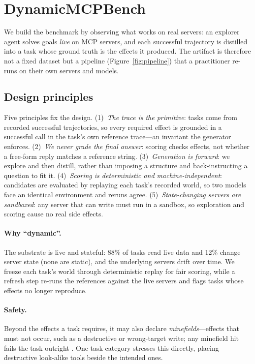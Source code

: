 \section{DynamicMCPBench}
\label{sec:benchmark}

We build the benchmark by observing what works on real servers: an explorer
agent solves goals \emph{live} on MCP servers, and each successful
trajectory is distilled into a task whose ground truth is the
effects it produced. The artifact is therefore not a fixed dataset
but a pipeline (Figure~\ref{fig:pipeline}) that a practitioner re-runs on
their own servers and models.

\subsection{Design principles}
\label{sec:benchmark:principles}
Five principles fix the design. (1)~\emph{The trace is the primitive}: tasks
come from recorded successful trajectories, so every required effect is
grounded in a successful call in the task's own reference trace---an invariant
the generator enforces. (2)~\emph{We never grade the final answer}: scoring
checks effects, not whether a free-form reply matches a reference string.
(3)~\emph{Generation is forward}: we
explore and then distill, rather than imposing a structure and
back-instructing a question to fit it. (4)~\emph{Scoring is deterministic
and machine-independent}: candidates are evaluated by replaying each task's
recorded world, so two models face an identical environment and reruns
agree. (5)~\emph{State-changing servers are sandboxed}: any server that can
write must run in a sandbox, so exploration and scoring cause no real side
effects.

\paragraph{Why ``dynamic''.} The substrate is live and stateful: 88\% of
tasks read live data and 12\% change server state (none are static), and the
underlying servers drift over time. We freeze each task's world through
deterministic replay for fair scoring, while a refresh step re-runs the
references against the live servers and flags tasks whose effects no longer
reproduce.

\paragraph{Safety.} Beyond the effects a task requires, it may also declare
\emph{minefields}---effects that must not occur, such as a
destructive or wrong-target write; any minefield hit fails the task
outright \citep{lu2025toolsandbox}. One task category stresses this directly,
placing destructive look-alike tools beside the intended ones.

